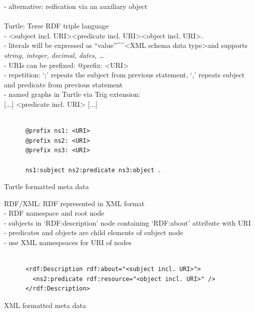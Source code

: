 - alternative: reification via an auxiliary object \\
\\
Turtle: Terse RDF triple language \\
- \textless subject incl. URI\textgreater \textless predicate incl. URI\textgreater \textless object incl. URI\textgreater . \\
- literals will be expressed as ``value''\^{}\^{}\textless XML schema data type\textgreater and supports \textit{string, integer, decimal, dates, \ldots} \\
- URIs can be prefixed: @prefix: \textless URI\textgreater \\
- repetition: `;' repeats the subject from previous statement, `,' repeats subject and predicate from previous statement \\
- named graphs in Turtle via Trig extension: \\
  { [...] } \textless predicate incl. URI\textgreater { [...] } \\
\\
\begin{listing}[H]
	\begin{verbatim}
	  @prefix ns1: <URI>
	  @prefix ns2: <URI>
	  @prefix ns3: <URI>

	  ns1:subject ns2:predicate ns3:object .
	\end{verbatim}
\caption{Turtle formatted meta data}
\label{lst:turtle_meta_data}
\end{listing}

RDF/XML: RDF represented in XML format \\
- RDF namespace and root node \\
- subjects in `RDF:description' node containing `RDF:about' attribute with URI \\
- predicates and objects are child elements of subject node \\
- use XML namespeaces for URI of nodes \\
\\
\begin{listing}[H]
	\begin{verbatim}
	  <rdf:Description rdf:about="<subject incl. URI>">
	    <ns2:predicate rdf:resource="<object incl. URI>" />
	  </rdf:Description>
	\end{verbatim}
\caption{\gls{XML} formatted meta data}
\label{lst:xml_meta_data}
\end{listing}

